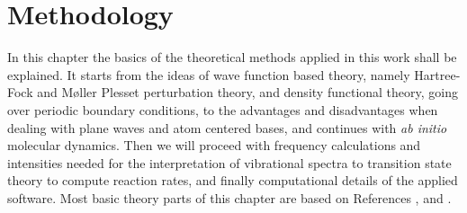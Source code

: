 \documentclass[11pt,DIV=13,BCOR=5mm,a4paper,headinclude]{scrbook}
\begin{document}
\chapter{Methodology}
In this chapter the basics of the theoretical methods applied in this work shall be explained.
It starts from the ideas of wave function based theory, namely Hartree-Fock and M\o{}ller Plesset perturbation theory, and density functional theory, going over periodic boundary conditions, to the advantages and disadvantages when dealing with plane waves and atom centered bases, and continues with \textit{ab initio} molecular dynamics.
Then we will proceed with frequency calculations and intensities needed for the interpretation of vibrational spectra to transition state theory to compute reaction rates, and finally computational details of the applied software.
Most basic theory parts of this chapter are based on References \cite{jensen}, \cite{Gross03} and \cite{szabo}.
\end{document}
